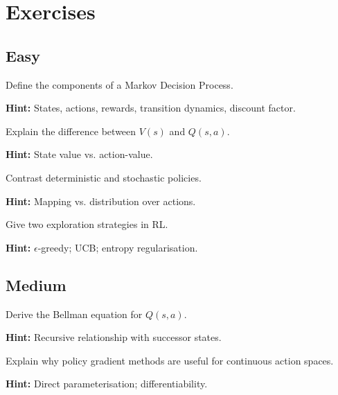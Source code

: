 
\section*{Exercises}

\subsection*{Easy}

\begin{problem}
Define the components of a Markov Decision Process.

\textbf{Hint:} States, actions, rewards, transition dynamics, discount factor.
\end{problem}

\begin{problem}
Explain the difference between $V(s)$ and $Q(s,a)$.

\textbf{Hint:} State value vs. action-value.
\end{problem}

\begin{problem}
Contrast deterministic and stochastic policies.

\textbf{Hint:} Mapping vs. distribution over actions.
\end{problem}

\begin{problem}
Give two exploration strategies in RL.

\textbf{Hint:} $\epsilon$-greedy; UCB; entropy regularisation.
\end{problem}

\subsection*{Medium}

\begin{problem}
Derive the Bellman equation for $Q(s,a)$.

\textbf{Hint:} Recursive relationship with successor states.
\end{problem}

\begin{problem}
Explain why policy gradient methods are useful for continuous action spaces.

\textbf{Hint:} Direct parameterisation; differentiability.
\end{problem}

